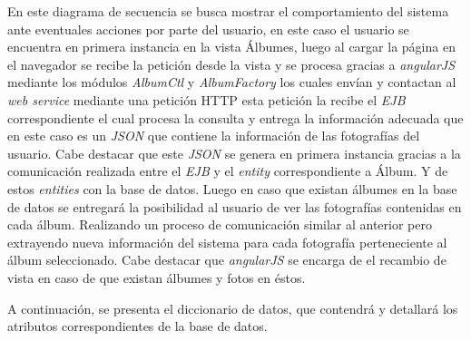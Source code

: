 \documentclass{memoria}
\begin{document}

En este diagrama de secuencia se busca mostrar el comportamiento del sistema ante eventuales acciones por parte del usuario, en este caso el usuario se encuentra en primera instancia en la vista Álbumes, luego al cargar la página en el navegador se recibe la petición desde la vista y se procesa gracias a \textsl{angularJS} mediante los módulos \textsl{AlbumCtl} y \textsl{AlbumFactory} los cuales envían y contactan al \textsl{web service} mediante una petición HTTP esta petición la recibe el \textsl{EJB} correspondiente el cual procesa la consulta y entrega la información adecuada que en este caso es un \textsl{JSON} que contiene la información de las fotografías del usuario. Cabe destacar que este \textsl{JSON} se genera en primera instancia gracias a la comunicación realizada entre el \textsl{EJB} y el \textsl{entity} correspondiente a Álbum. Y de estos \textsl{entities} con la base de datos.  Luego en caso que existan álbumes en la base de datos se entregará la posibilidad al usuario de ver las fotografías contenidas en cada álbum. Realizando un proceso de comunicación similar al anterior pero extrayendo nueva información del sistema para cada fotografía perteneciente al álbum seleccionado. Cabe destacar que \textsl{angularJS} se encarga de el recambio de vista en caso de que existan álbumes y fotos en éstos.



A continuación, se presenta el diccionario de datos, que contendrá y detallará los atributos correspondientes de la base de datos.
\end{document}
